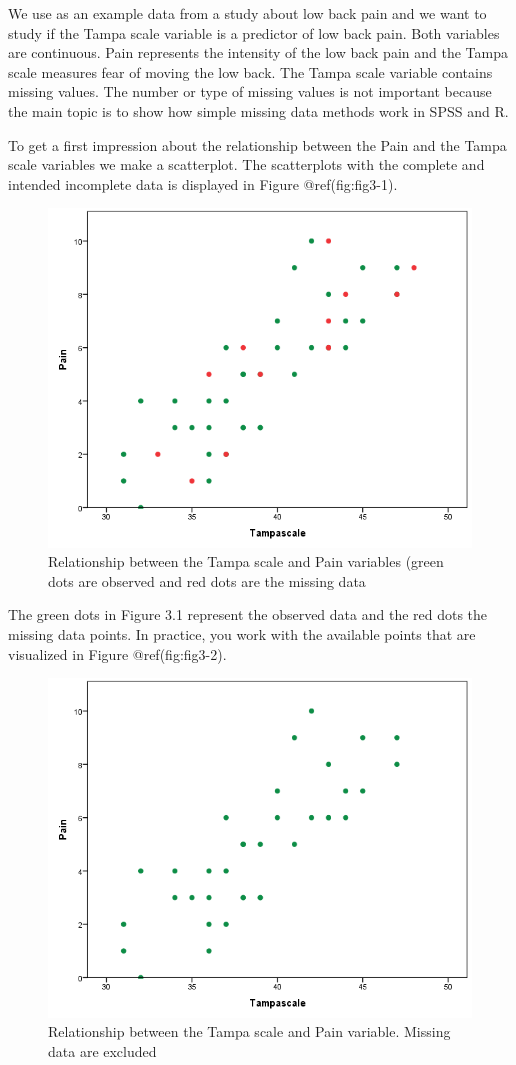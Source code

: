 \documentclass[
]{book}
\begin{document}
We use as an example data from a study about low back pain and we want
to study if the Tampa scale variable is a predictor of low back pain.
Both variables are continuous. Pain represents the intensity of the low
back pain and the Tampa scale measures fear of moving the low back. The
Tampa scale variable contains missing values. The number or type of
missing values is not important because the main topic is to show how
simple missing data methods work in SPSS and R.

To get a first impression about the relationship between the Pain and
the Tampa scale variables we make a scatterplot. The scatterplots with
the complete and intended incomplete data is displayed in Figure
@ref(fig:fig3-1).

\begin{figure}
\includegraphics[width=0.7\linewidth]{images/fig3.2a} \caption{Relationship between the Tampa scale and Pain variables (green dots are observed and red dots are the missing data}\label{fig:fig3-1}
\end{figure}

The green dots in Figure 3.1 represent the observed data and the red
dots the missing data points. In practice, you work with the available
points that are visualized in Figure @ref(fig:fig3-2).

\begin{figure}

{\centering \includegraphics[width=0.7\linewidth]{images/fig3.2b} 

}

\caption{Relationship between the Tampa scale and Pain variable. Missing data are excluded}\label{fig:fig3-2}
\end{figure}
\end{document}
